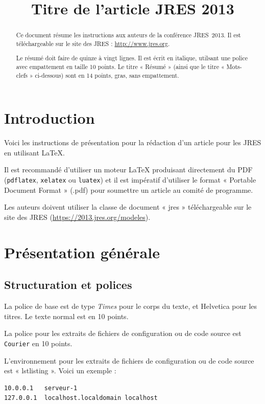 \documentclass[city=Montpellier,year=2013]{jres}
\title{Titre de l'article JRES 2013}
\begin{document}
\maketitle

\begin{abstract}
Ce document résume les instructions aux auteurs de la conférence JRES~2013.
Il est téléchargeable sur le site des JRES : \url{http://www.jres.org}.

Le résumé doit faire de quinze à vingt lignes. Il est écrit en italique,
utilsant une police avec empattement en taille 10 points.
Le titre « Résumé » (ainsi que le titre « Mots-clefs » ci-dessous)
sont en 14 points, gras, sans empattement.
\end{abstract}


\section{Introduction}

Voici les instructions de présentation pour la rédaction d'un article
pour les JRES en utilisant \LaTeX{}.

Il est recommandé d'utiliser un moteur \LaTeX{} produisant directement
du PDF (\texttt{pdflatex}, \texttt{xelatex} ou \texttt{luatex}) et il est
impératif d'utiliser le format « Portable Document Format » (.pdf) pour
soumettre un article au comité de programme.

Les auteurs doivent utiliser la classe de document « jres » téléchargeable
sur le site des JRES (\url{https://2013.jres.org/modeles}).

\section{Présentation générale}

\subsection{Structuration et polices}

La police de base est de type \emph{Times} pour le corps du texte, et
\textsf{Helvetica} pour les titres.
Le texte  normal est en 10 points.

La police pour les extraits de fichiers de configuration ou de code
source est \texttt{Courier} en 10 points.

L'environnement pour les extraits de fichiers de configuration ou
de code source  est « lstlisting ». Voici un exemple :
\vspace{2ex}
\begin{lstlisting}
10.0.0.1   serveur-1
127.0.0.1  localhost.localdomain localhost
\end{lstlisting}
\end{document}
